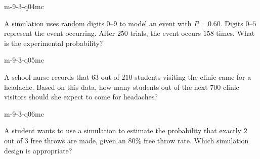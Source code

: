 \begin{practiceQuestion}{m-9-3-q04}{mc}
\begin{questionText}
A simulation uses random digits $0$--$9$ to model an event with $P = 0.60$. Digits $0$--$5$ represent the event occurring. After $250$ trials, the event occurs $158$ times. What is the experimental probability?
\end{questionText}
\end{practiceQuestion}

\begin{practiceQuestion}{m-9-3-q05}{mc}
\begin{questionText}
A school nurse records that $63$ out of $210$ students visiting the clinic came for a headache. Based on this data, how many students out of the next $700$ clinic visitors should she expect to come for headaches?
\end{questionText}
\end{practiceQuestion}

\begin{practiceQuestion}{m-9-3-q06}{mc}
\begin{questionText}
A student wants to use a simulation to estimate the probability that exactly $2$ out of $3$ free throws are made, given an $80\%$ free throw rate. Which simulation design is appropriate?
\end{questionText}
\end{practiceQuestion}

